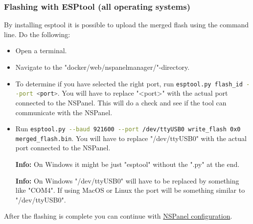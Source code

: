\documentclass[10pt]{article}
\newcommand{\info}[1]{\begin{infoBox} \textbf{Info:} #1 \end{infoBox}}
\begin{document}
    \subsubsection{Flashing with ESPtool (all operating systems)}
    By installing esptool it is possible to upload the merged flash using the command line. Do the following:
    \begin{itemize}
      \item Open a terminal.
      \item Navigate to the "docker/web/nspanelmanager/"-directory.
      \item To determine if you have selected the right port, run \lstinline[language=bash]|esptool.py flash_id --port <port>|. You will have to replace "<port>" with the actual port connected to the NSPanel. This will do a check and see if the tool can communicate with the NSPanel.
      \item Run \lstinline[language=bash]|esptool.py --baud 921600 --port /dev/ttyUSB0 write_flash 0x0 merged_flash.bin|. You will have to replace "/dev/ttyUSB0" with the actual port connected to the NSPanel.
      \info{On Windows it might be just "esptool" without the ".py" at the end.}
      \info{On Windows "/dev/ttyUSB0" will have to be replaced by something like "COM4". If using MacOS or Linux the port will be something similar to "/dev/ttyUSB0".}
    \end{itemize}
    After the flashing is complete you can continue with \hyperref[sec:nspanel_configuration]{NSPanel configuration}.
 
\end{document}
